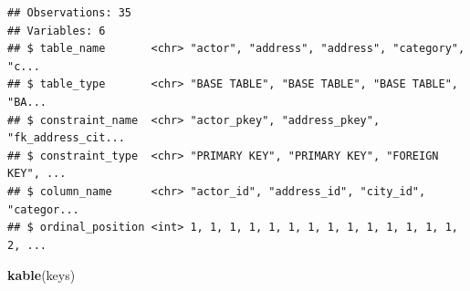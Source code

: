 \documentclass[]{book}
\newenvironment{Shaded}{\begin{snugshade}}{\end{snugshade}}
\newcommand{\KeywordTok}[1]{\textcolor[rgb]{0.13,0.29,0.53}{\textbf{#1}}}
\newcommand{\NormalTok}[1]{#1}
\theoremstyle{definition}
\theoremstyle{definition}
\theoremstyle{definition}
\theoremstyle{remark}
\begin{document}
\begin{verbatim}
## Observations: 35
## Variables: 6
## $ table_name       <chr> "actor", "address", "address", "category", "c...
## $ table_type       <chr> "BASE TABLE", "BASE TABLE", "BASE TABLE", "BA...
## $ constraint_name  <chr> "actor_pkey", "address_pkey", "fk_address_cit...
## $ constraint_type  <chr> "PRIMARY KEY", "PRIMARY KEY", "FOREIGN KEY", ...
## $ column_name      <chr> "actor_id", "address_id", "city_id", "categor...
## $ ordinal_position <int> 1, 1, 1, 1, 1, 1, 1, 1, 1, 1, 1, 1, 1, 1, 2, ...
\end{verbatim}

\begin{Shaded}
\begin{Highlighting}[]
\KeywordTok{kable}\NormalTok{(keys)}
\end{Highlighting}
\end{Shaded}
\end{document}
